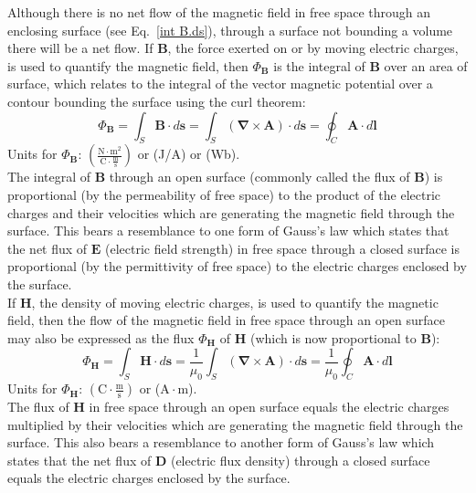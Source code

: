 Although there is no net flow of the magnetic field in free space through an enclosing surface (see Eq.~\ref{int B.ds}), through a surface not bounding a volume there will be a net flow.  If $\mathbf{B}$, the force exerted on or by moving electric charges, is used to quantify the magnetic field, then  $\Phi_{\mathbf{B}}$ is the integral of $\mathbf{B}$ over an area of surface, which relates to the integral of the vector magnetic potential over a contour bounding the surface using the curl theorem:
\begin{equation}\label{Phi_B}
\Phi_{\mathbf{B}} = \int_S \mathbf{B} \cdot d\mathbf{s} = \int_S (\mathbf{\nabla} \times \mathbf{A}) \cdot d\mathbf{s} = \oint_C \mathbf{A} \cdot d\mathbf{l}
\end{equation}
{\noindent}Units for $\Phi_{\mathbf{B}}$: $\left( \frac{\mathrm{N} \cdot \mathrm{m^2}}{\mathrm{C} \cdot \frac{\mathrm{m}}{\mathrm{s}}} \right)$ or (J/A) or (Wb).\\
The integral of $\mathbf{B}$ through an open surface (commonly called the flux of $\mathbf{B}$) is proportional (by the permeability of free space) to the product of the electric charges and their velocities which are generating the magnetic field through the surface.  This bears a resemblance to one form of Gauss's law which states that the net flux of $\mathbf{E}$ (electric field strength) in free space through a closed surface is proportional (by the permittivity of free space) to the electric charges enclosed by the surface.\\

If $\mathbf{H}$, the density of moving electric charges, is used to quantify the magnetic field, then the flow of the magnetic field in free space through an open surface may also be expressed as the flux $\Phi_{\mathbf{H}}$ of $\mathbf{H}$ (which is now proportional to $\mathbf{B}$):
\begin{equation}\label{H flux}
\Phi_{\mathbf{H}} = \int_S \mathbf{H} \cdot d\mathbf{s} = \frac{1}{\mu_0} \int_S (\mathbf{\nabla} \times \mathbf{A}) \cdot d\mathbf{s} = \frac{1}{\mu_0} \oint_C \mathbf{A} \cdot d\mathbf{l}
\end{equation}
{\noindent}Units for $\Phi_{\mathbf{H}}$: $\left( \mathrm{C} \cdot \frac{\mathrm{m}}{\mathrm{s}}\right)$ or ($\mathrm{A} \cdot \mathrm{m}$).\\
The flux of $\mathbf{H}$ in free space through an open surface equals the electric charges multiplied by their velocities which are generating the magnetic field through the surface.  This also bears a resemblance to another form of Gauss's law which states that the net flux of $\mathbf{D}$ (electric flux density) through a closed surface equals the electric charges enclosed by the surface.\\

